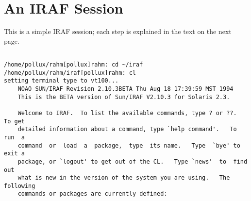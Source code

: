 \newpage


\section{An IRAF Session}

This is a simple IRAF session; each step is explained in the text on
the next page.

{\footnotesize
\begin{verbatim}

/home/pollux/rahm[pollux]rahm: cd ~/iraf
/home/pollux/rahm/iraf[pollux]rahm: cl
setting terminal type to vt100...
    NOAO SUN/IRAF Revision 2.10.3BETA Thu Aug 18 17:39:59 MST 1994
    This is the BETA version of Sun/IRAF V2.10.3 for Solaris 2.3.

    Welcome to IRAF.  To list the available commands, type ? or ??.  To get
    detailed information about a command, type `help command'.   To  run  a
    command  or  load  a  package,  type  its name.   Type  `bye' to exit a
    package, or `logout' to get out of the CL.   Type `news'  to  find  out
    what is new in the version of the system you are using.   The following
    commands or packages are currently defined:


\end{verbatim}}
